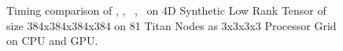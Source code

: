 \begin{figure}

\caption{Timing comparison of \MU, \HALS, \BPP\, \ADMM, \Nestrov\ on 4D Synthetic Low Rank Tensor of size 384x384x384x384 on 81 Titan Nodes as 3x3x3x3 Processor Grid on CPU and GPU.}
\label{fig:cpuvsgpulowrank}
\end{figure}



